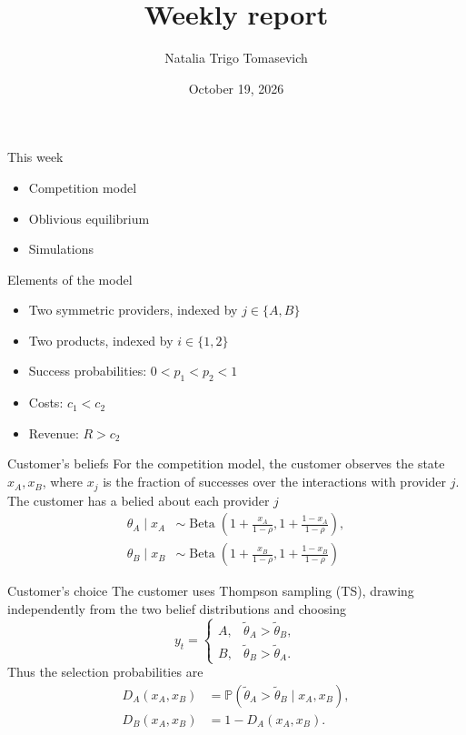\documentclass[10pt]{beamer}
\title{Weekly report}
\author{Natalia Trigo Tomasevich}
\date{October 19, 2026}
\begin{document}
\frame{\titlepage}

\begin{frame}{This week}
    \begin{itemize}[<+->]
        \item Competition model
        \item Oblivious equilibrium 
        \item Simulations 
    \end{itemize}
\end{frame}

\begin{frame}{Elements of the model}
    \begin{itemize}
        \item Two symmetric providers, indexed by $j\in\{A,B\}$
        \item Two products, indexed by $i\in\{1,2\}$
        \item Success probabilities: $0<p_1<p_2<1$
        \item Costs: $c_1<c_2$
        \item Revenue: $R>c_2$
    \end{itemize}
\end{frame}

\begin{frame}{Customer's beliefs}
    For the competition model, the customer observes the state $x_A,x_B$, where $x_j$ is the fraction of successes over the interactions with provider $j$. The customer has a belied about each provider $j$
    \begin{align}
        \theta_A\mid x_A&\sim\operatorname{Beta}(1+\frac{x_A}{1-\rho},1+\frac{1-x_A}{1-\rho}),\\
        \theta_B\mid x_B&\sim\operatorname{Beta}(1+\frac{x_B}{1-\rho},1+\frac{1-x_B}{1-\rho})
    \end{align}
\end{frame}

\begin{frame}{Customer's choice}
    The customer uses Thompson sampling (TS), drawing independently from the
    two belief distributions and choosing
    \begin{equation}
        y_t=
        \begin{cases}
            A,&\widetilde\theta_A>\widetilde\theta_B,\\
            B,&\widetilde\theta_B>\widetilde\theta_A.
        \end{cases}
    \end{equation}
    Thus the selection probabilities are
    \begin{equation}
        \begin{aligned}
            D_A(x_A,x_B)&=\mathbb{P}(\widetilde\theta_A>\widetilde\theta_B\mid x_A,x_B),\\
            D_B(x_A,x_B)&=1-D_A(x_A,x_B).
        \end{aligned}
    \end{equation}
\end{frame}
\end{document}

